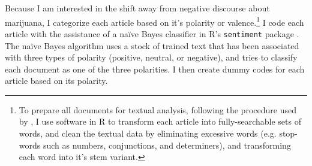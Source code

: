 




Because I am interested in the shift away from negative discourse about marijuana, I categorize each article based on it's polarity or valence.\footnote{To prepare all documents for textual analysis, following the procedure used by \citet{bail_2012}, I use software in R to transform each article into fully-searchable sets of words, and clean the textual data by eliminating excessive words (e.g. stop-words such as numbers, conjunctions, and determiners), and transforming each word into it's stem variant.} I code each article with the assistance of a na\"{i}ve Bayes classifier in \textsf{R}'s \texttt{sentiment} package \citep{jurka_2012}. The na\"{i}ve Bayes algorithm uses a stock of trained text that has been associated with three types of polarity (positive, neutral, or negative), and tries to classify each document as one of the three polarities. I then create dummy codes for each article based on its polarity. 


